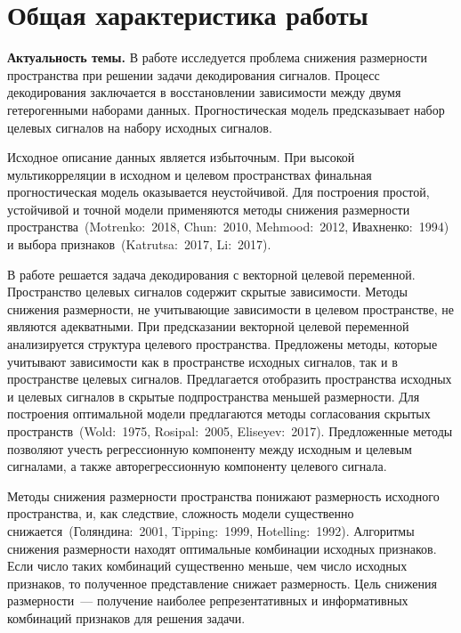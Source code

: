 \documentclass[11pt, a5paper]{dissert}
\begin{document}
\clearpage




\section*{Общая характеристика работы}
\label{ch:Intro}

\textbf{Актуальность темы.} 
В работе исследуется проблема снижения размерности пространства при решении задачи декодирования сигналов. 
Процесс декодирования заключается в восстановлении зависимости между двумя гетерогенными наборами данных.
Прогностическая модель предсказывает набор целевых сигналов на набору исходных сигналов.

Исходное описание данных является избыточным. 
При высокой мультикорреляции в исходном и целевом пространствах финальная прогностическая модель оказывается неустойчивой.
Для построения простой, устойчивой и точной модели применяются методы снижения размерности пространства~(Motrenko:~2018, Chun:~2010, Mehmood:~2012, Ивахненко:~1994)  и выбора признаков~(Katrutsa:~2017, Li:~2017).

В работе решается задача декодирования с векторной целевой переменной. 
Пространство целевых сигналов содержит скрытые зависимости. 
Методы снижения размерности, не учитывающие зависимости в целевом пространстве, не являются адекватными.
При предсказании векторной целевой переменной анализируется структура целевого пространства.
Предложены методы, которые учитывают зависимости как в пространстве исходных сигналов, так и в пространстве целевых сигналов.
Предлагается отобразить пространства исходных и целевых сигналов в скрытые подпространства меньшей размерности.
Для построения оптимальной модели предлагаются методы согласования скрытых пространств~(Wold:~1975, Rosipal:~2005, Eliseyev:~2017).
Предложенные методы позволяют учесть регрессионную компоненту между исходным и целевым сигналами, а также авторегрессионную компоненту целевого сигнала.

Методы снижения размерности пространства понижают размерность исходного пространства, и, как следствие, сложность модели существенно снижается~(Голяндина:~2001, Tipping:~1999, Hotelling:~1992). 
Алгоритмы снижения размерности находят оптимальные комбинации исходных признаков. 
Если число таких комбинаций существенно меньше, чем число исходных признаков, то полученное представление снижает размерность.
Цель снижения размерности~--- получение наиболее репрезентативных и информативных комбинаций признаков для решения задачи.
\end{document}
